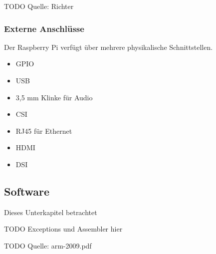 TODO Quelle: Richter

\subsubsection{Externe Anschlüsse}
Der Raspberry Pi verfügt über mehrere physikalische Schnittstellen. 
\begin{itemize}
\item \ac{GPIO}
\item USB
\item 3,5 mm Klinke für Audio
\item \ac{CSI}
\item RJ45 für Ethernet
\item HDMI
\item \ac{DSI}
\end{itemize}
 
\subsection{Software}
Dieses Unterkapitel betrachtet 
 
TODO Exceptions und Assembler hier





          
 
TODO Quelle: arm-2009.pdf